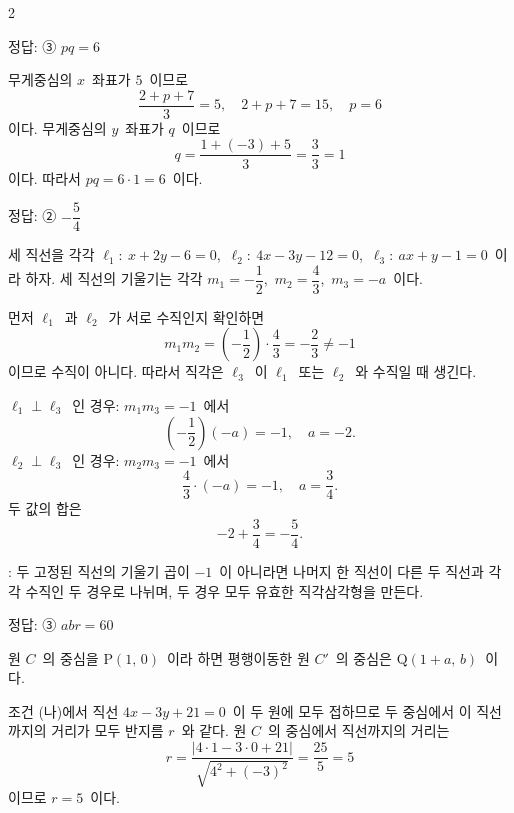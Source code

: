 \documentclass[10pt,fleqn]{article}
\begin{document}
\begin{multicols*}{2}
\begin{dmanswerbox}
정답: ③ $pq=6$
\end{dmanswerbox}

무게중심의 $x$\ 좌표가 $5$\ 이므로
\[ \dfrac{2+p+7}{3} = 5,\quad 2+p+7=15,\quad p=6 \]
이다. 무게중심의 $y$\ 좌표가 $q$\ 이므로
\[ q = \dfrac{1+(-3)+5}{3} = \dfrac{3}{3} = 1 \]
이다. 따라서 $pq = 6\cdot 1 = 6$\ 이다.

\begin{dmanswerbox}
정답: ② $-\dfrac{5}{4}$
\end{dmanswerbox}

세 직선을 각각 $\ell_1:\ x+2y-6=0$,\ $\ell_2:\ 4x-3y-12=0$,\ $\ell_3:\ ax+y-1=0$\ 이라 하자. 세 직선의 기울기는 각각 $m_1=-\dfrac{1}{2}$,\ $m_2=\dfrac{4}{3}$,\ $m_3=-a$\ 이다.

먼저 $\ell_1$\ 과 $\ell_2$\ 가 서로 수직인지 확인하면
\[ m_1 m_2 = \left(-\dfrac{1}{2}\right)\cdot\dfrac{4}{3} = -\dfrac{2}{3} \ne -1 \]
이므로 수직이 아니다. 따라서 직각은 $\ell_3$\ 이 $\ell_1$\ 또는 $\ell_2$\ 와 수직일 때 생긴다.

$\ell_1 \perp \ell_3$\ 인 경우: $m_1 m_3 = -1$\ 에서
\[ \left(-\dfrac{1}{2}\right)(-a) = -1,\quad a = -2. \]
$\ell_2 \perp \ell_3$\ 인 경우: $m_2 m_3 = -1$\ 에서
\[ \dfrac{4}{3}\cdot(-a) = -1,\quad a = \dfrac{3}{4}. \]
두 값의 합은
\[ -2+\dfrac{3}{4} = -\dfrac{5}{4}. \]

\begin{dmcriticalpoint}
: 두 고정된 직선의 기울기 곱이 $-1$\ 이 아니라면 나머지 한 직선이 다른 두 직선과 각각 수직인 두 경우로 나뉘며, 두 경우 모두 유효한 직각삼각형을 만든다.
\end{dmcriticalpoint}

\begin{dmanswerbox}
정답: ③ $abr=60$
\end{dmanswerbox}

원 $C$\ 의 중심을 $\mathrm{P}(1,\,0)$\ 이라 하면 평행이동한 원 $C'$\ 의 중심은 $\mathrm{Q}(1+a,\,b)$\ 이다.

조건 (나)에서 직선 $4x-3y+21=0$\ 이 두 원에 모두 접하므로 두 중심에서 이 직선까지의 거리가 모두 반지름 $r$\ 와 같다. 원 $C$\ 의 중심에서 직선까지의 거리는
\[ r = \dfrac{|4\cdot 1-3\cdot 0+21|}{\sqrt{4^2+(-3)^2}} = \dfrac{25}{5} = 5 \]
이므로 $r=5$\ 이다.


\end{multicols*}
\end{document}
